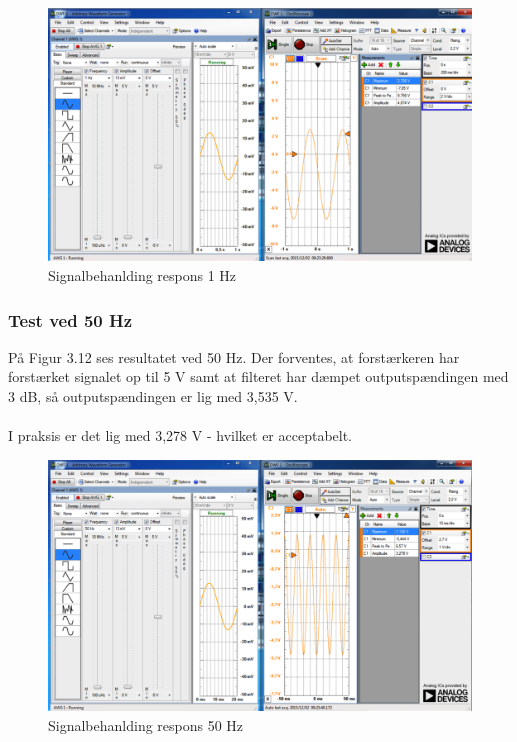 \begin{figure}[H]
	\centering
	\includegraphics[width=1\textwidth]{Figurer/Snip20151202_27}
	\caption{Signalbehanlding respons 1 Hz}
	\label{fig:Signalbehanlding}
\end{figure}

\subsubsection{Test ved 50 Hz}
På Figur 3.12 ses resultatet ved 50 Hz. Der forventes, at forstærkeren har forstærket signalet op til 5 V samt at filteret har dæmpet outputspændingen med 3 dB, så outputspændingen er lig med 3,535 V. 
\\ \\
I praksis er det lig med 3,278 V - hvilket er acceptabelt.    
  

\begin{figure}[H]
	\centering
	\includegraphics[width=1\textwidth]{Figurer/Snip20151202_28}
	\caption{Signalbehanlding respons 50 Hz}
	\label{fig:Signalbehanlding}
\end{figure}

